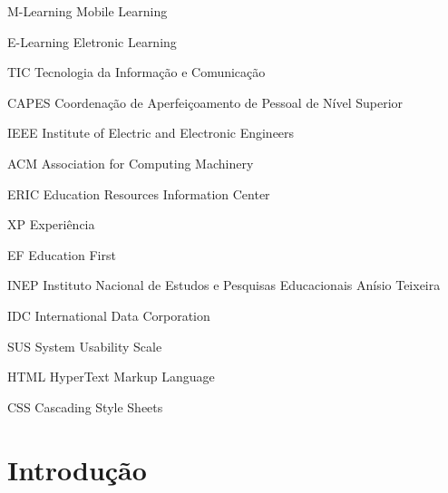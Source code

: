 \documentclass[
	12pt,				%
	openany,			%
	oneside,			%
	a4paper,			%
	english,			%
	french,				%
	spanish,			%
	brazil				%
	]{abntex2}
\begin{document}

\listoffigures*
\cleardoublepage

\listoftables*
\cleardoublepage

\begin{siglas}
  \item[M-Learning] Mobile Learning
  \item[E-Learning] Eletronic Learning
\item [TIC] Tecnologia da Informação e Comunicação
\item[CAPES] Coordenação de Aperfeiçoamento de Pessoal de Nível Superior
\item [IEEE] Institute of Electric and Electronic Engineers
\item[ACM] Association for Computing Machinery
\item [ERIC] Education Resources Information Center
\item [XP] Experiência
\item [EF] Education First
\item [INEP] Instituto Nacional de Estudos e Pesquisas Educacionais Anísio Teixeira
\item [IDC] International Data Corporation
\item [SUS] System Usability Scale
\item [HTML] HyperText Markup Language
\item [CSS] Cascading Style Sheets
\end{siglas}



\tableofcontents*
\cleardoublepage



\textual

\chapter{Introdução}
\end{document}
